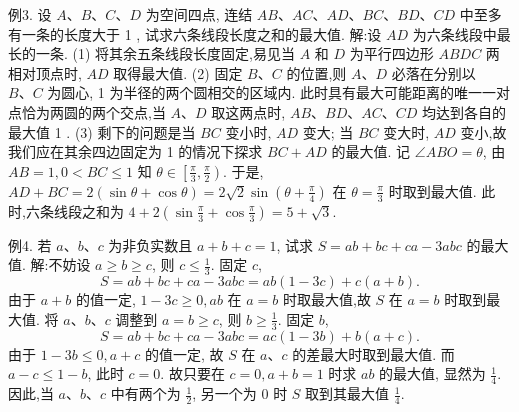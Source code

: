 例3. 设 $A 、 B 、 C 、 D$ 为空间四点, 连结 $A B 、 A C 、 A D 、 B C 、 B D 、 C D$ 中至多有一条的长度大于 1 , 试求六条线段长度之和的最大值.
解:设 $A D$ 为六条线段中最长的一条.
(1) 将其余五条线段长度固定,易见当 $A$ 和 $D$ 为平行四边形 $A B D C$ 两相对顶点时, $A D$ 取得最大值.
(2) 固定 $B 、 C$ 的位置,则 $A 、 D$ 必落在分别以 $B 、 C$ 为圆心, 1 为半径的两个圆相交的区域内.
此时具有最大可能距离的唯一一对点恰为两圆的两个交点,当 $A 、 D$ 取这两点时, $A B 、 B D 、 A C 、 C D$ 均达到各自的最大值 1 .
(3) 剩下的问题是当 $B C$ 变小时, $A D$ 变大; 当 $B C$ 变大时, $A D$ 变小,故我们应在其余四边固定为 1 的情况下探求 $B C+A D$ 的最大值.
记 $\angle A B O=\theta$, 由 $A B=1,0<B C \leqslant 1$ 知 $\theta \in\left[\frac{\pi}{3}, \frac{\pi}{2}\right)$.
于是, $A D+B C=2(\sin \theta+\cos \theta)=2 \sqrt{2} \sin \left(\theta+\frac{\pi}{4}\right)$ 在 $\theta=\frac{\pi}{3}$ 时取到最大值.
此时,六条线段之和为 $4+2\left(\sin \frac{\pi}{3}+\cos \frac{\pi}{3}\right)=5+\sqrt{3}$.



例4. 若 $a 、 b 、 c$ 为非负实数且 $a+b+c=1$, 试求 $S=a b+b c+c a-3 a b c$ 的最大值.
解:不妨设 $a \geqslant b \geqslant c$, 则 $c \leqslant \frac{1}{3}$. 固定 $c$,
$$
S=a b+b c+c a-3 a b c=a b(1-3 c)+c(a+b) .
$$
由于 $a+b$ 的值一定, $1-3 c \geqslant 0, a b$ 在 $a=b$ 时取最大值,故 $S$ 在 $a=b$ 时取到最大值.
将 $a 、 b 、 c$ 调整到 $a=b \geqslant c$, 则 $b \geqslant \frac{1}{3}$. 固定 $b$,
$$
S=a b+b c+c a-3 a b c=a c(1-3 b)+b(a+c) .
$$
由于 $1-3 b \leqslant 0, a+c$ 的值一定, 故 $S$ 在 $a 、 c$ 的差最大时取到最大值.
而 $a-c \leqslant 1-b$, 此时 $c=0$.
故只要在 $c=0, a+b=1$ 时求 $a b$ 的最大值, 显然为 $\frac{1}{4}$.
因此,当 $a 、 b 、 c$ 中有两个为 $\frac{1}{2}$, 另一个为 0 时 $S$ 取到其最大值 $\frac{1}{4}$.



